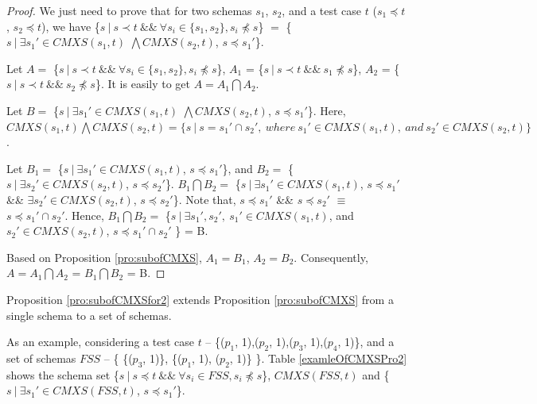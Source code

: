 \begin{proof}

We just need to prove that for two schemas $s_{1}$, $s_{2}$, and a test case $t$ ($s_{1} \preceq t$, $s_{2} \preceq t$), we have \{$s\ |\ s \prec t\ \&\&\ \forall s_{i} \in \{s_{1}, s_{2}\}, s_{i} \npreceq s $\} $=$  \{$ s\ |\ \exists s_{1}' \in CMXS(s_{1}, t)$ $\bigwedge CMXS(s_{2}, t)$, $s \preceq s_{1}'$\}.

Let $A = $ \{$s\ |\ s \prec t\ \&\&\ \forall s_{i} \in \{s_{1}, s_{2}\}, s_{i} \npreceq s $\}, $A_{1}$ = \{$s\ |\ s \prec t\ \&\&\  s_{1} \npreceq s $\}, $A_{2}$ = \{$s\ |\ s \prec t\ \&\&\  s_{2} \npreceq s $\}. It is easily to get $A = A_{1} \bigcap A_{2}$.

Let $B = $ \{$ s\ |\ \exists s_{1}' \in CMXS(s_{1}, t)$ $\bigwedge CMXS(s_{2}, t)$, $s \preceq s_{1}'$\}. Here,  $ CMXS(s_{1}, t) \bigwedge CMXS(s_{2}, t) = \{ s\ |\ s = s_{1}' \cap s_{2}',\ where\ s_{1}' \in CMXS(s_{1}, t),\ and\ s_{2}' \in CMXS(s_{2}, t) \}$.

Let $B_{1} = $ \{$ s\ |\ \exists s_{1}' \in CMXS(s_{1}, t)$, $s \preceq s_{1}'$\}, and $B_{2} = $ \{$ s\ |\ \exists s_{2}' \in CMXS(s_{2}, t)$, $s \preceq s_{2}'$\}. $B_{1} \bigcap B_{2} = $ \{$ s\ |\ \exists s_{1}' \in CMXS(s_{1}, t)$, $s \preceq s_{1}'$ \&\& $\exists s_{2}' \in CMXS(s_{2}, t)$, $s \preceq s_{2}'$\}. Note that, $s \preceq s_{1}'$ \&\& $s \preceq s_{2}'$ $\equiv$ $s \preceq s_{1}' \cap s_{2}'$. Hence, $B_{1} \bigcap B_{2} = $ \{$ s\ |\ \exists s_{1}', s_{2}',\  s_{1}' \in CMXS(s_{1}, t)$, and $s_{2}' \in CMXS(s_{2}, t)$, $s \preceq s_{1}' \cap s_{2}'$ \} = B.

Based on Proposition \ref{pro:subofCMXS}, $A_{1} = B_{1}$, $A_{2} = B_{2}$. Consequently,
$A = A_{1} \bigcap A_{2}$ = $B_{1} \bigcap B_{2}$  = B.

\end{proof}

Proposition \ref{pro:subofCMXSfor2} extends Proposition \ref{pro:subofCMXS} from a single schema to a set of schemas.

As an example, considering a test case $t$ -- \{($p_{1}$, 1),($p_{2}$, 1),($p_{3}$, 1),($p_{4}$, 1)\}, and a set of schemas  $FSS$ -- \{ \{($p_{3}$, 1)\},  \{($p_{1}$, 1), ($p_{2}$, 1)\} \}. Table \ref{examleOfCMXSPro2} shows the schema set \{$s\ |\ s \preceq t\ \&\&\ \forall s_{i} \in FSS, s_{i} \npreceq s $\}, $CMXS(FSS, t)$ and \{$ s\ |\ \exists s_{1}' \in CMXS(FSS, t)$, $s \preceq s_{1}'$\}.


